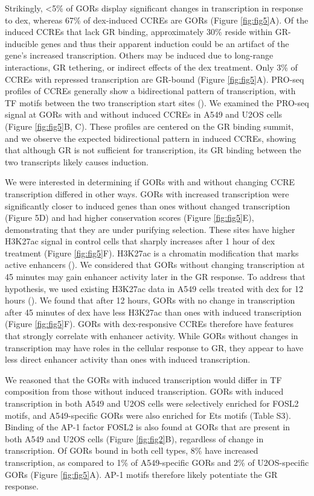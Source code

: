 \documentclass{article}
\begin{document}
{Strikingly, <5\% of GORs display significant changes in transcription in response to dex, whereas 67\% of dex-induced CCREs are GORs (Figure \ref{fig:fig5}A). Of the induced CCREs that lack GR binding, approximately 30\% reside within GR-inducible genes  and thus their apparent induction could be an artifact of the gene’s increased transcription. Others may be induced due to long-range interactions, GR tethering, or indirect effects of the dex treatment. Only 3\% of CCREs with repressed transcription are GR-bound (Figure \ref{fig:fig5}A). PRO-seq profiles of CCREs generally show a bidirectional pattern of transcription, with TF motifs between the two transcription start sites (\cite{core_analysis_2014, tippens_transcription_2020}). We examined the PRO-seq signal at GORs with and without induced CCREs in A549 and U2OS cells (Figure \ref{fig:fig5}B, C). These profiles are centered on the GR binding summit, and we observe the expected bidirectional pattern in induced CCREs, showing that although GR is not sufficient for transcription, its GR binding between the two transcripts likely causes induction. 

We were interested in determining if GORs with and without changing CCRE transcription differed in other ways. GORs with increased transcription were significantly closer to induced genes than ones without changed transcription (Figure 5D) and had higher conservation scores (Figure \ref{fig:fig5}E), demonstrating that they are under purifying selection. These sites have higher H3K27ac signal in control cells that sharply increases after 1 hour of dex treatment (Figure \ref{fig:fig5}F). H3K27ac is a chromatin modification that marks active enhancers (\cite{creyghton_histone_2010}). We considered that GORs without changing transcription at 45 minutes may gain enhancer activity later in the GR response. To address that hypothesis, we used existing H3K27ac data in A549 cells treated with dex for 12 hours (\cite{mcdowell_glucocorticoid_2018}). We found that after 12 hours, GORs with no change in transcription after 45 minutes of dex have less H3K27ac than ones with induced transcription (Figure \ref{fig:fig5}F). GORs with dex-responsive CCREs therefore have features that strongly correlate with enhancer activity. While GORs without changes in transcription may have roles in the cellular response to GR, they appear to have less direct enhancer activity than ones with induced transcription.

We reasoned that the GORs with induced transcription would differ in TF composition from those without induced transcription. GORs with induced transcription in both A549 and U2OS cells were selectively enriched for FOSL2 motifs, and A549-specific GORs were also enriched for Ets motifs (Table S3). Binding of the AP-1 factor FOSL2 is also found at GORs that are present in both A549 and U2OS cells (Figure \ref{fig:fig2}B), regardless of change in transcription. Of GORs bound in both cell types, 8\% have increased transcription, as compared to 1\% of A549-specific GORs and 2\% of U2OS-specific GORs (Figure \ref{fig:fig5}A). AP-1 motifs therefore likely potentiate the GR response. 

}
\end{document}
